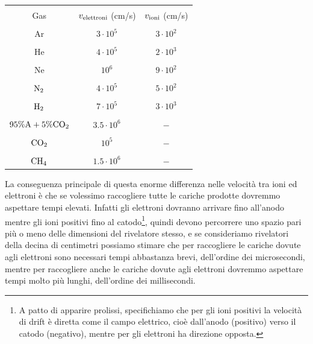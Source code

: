 \begin{center}
   \begin{tabular}{|c|c|c|}
     \hline
     &&\\[-0.4cm]
     Gas & $v_{\rm elettroni}$ (cm/s) & $v_{\rm ioni}$ (cm/s)\\
     \hline
     &&\\[-0.35cm]
     Ar & $3 \cdot 10^5$ & $3 \cdot 10^2$\\
     \hline
     &&\\[-0.35cm]
     He & $4 \cdot 10^5$ & $2 \cdot 10^3$\\
     \hline
     &&\\[-0.35cm]
     Ne & $10^6$ & $9 \cdot 10^2$\\
     \hline
     &&\\[-0.35cm]
     $\rm N_2$ & $4 \cdot 10^5$ & $5 \cdot 10^2$\\
     \hline
     &&\\[-0.35cm]
     $\rm H_2$ & $7 \cdot 10^5$ & $3 \cdot 10^3$\\
     \hline
     &&\\[-0.35cm]
     $\rm 95\% A + 5\% CO_2$ & $3.5 \cdot 10^6$ & $-$\\
     \hline
     &&\\[-0.35cm]
     $\rm CO_2$ & $10^5$ & $-$\\
     \hline
     &&\\[-0.35cm]
     $\rm CH_4$ & $1.5 \cdot 10^6$ & $-$\\
     \hline
   \end{tabular}
\end{center}
La conseguenza principale di questa enorme differenza nelle velocità tra ioni ed elettroni è che se volessimo raccogliere tutte le cariche prodotte dovremmo aspettare tempi elevati. Infatti gli elettroni dovranno arrivare fino all'anodo mentre gli ioni positivi fino al catodo\footnote{A patto di apparire prolissi, specifichiamo che per gli ioni positivi la velocità di drift è diretta come il campo elettrico, cioè dall'anodo (positivo) verso il catodo (negativo), mentre per gli elettroni ha direzione opposta.}, quindi devono percorrere uno spazio pari più o meno delle dimensioni del rivelatore stesso, e se consideriamo rivelatori della decina di centimetri possiamo stimare che per raccogliere le cariche dovute agli elettroni sono necessari tempi abbastanza brevi, dell'ordine dei microsecondi, mentre per raccogliere anche le cariche dovute agli elettroni dovremmo aspettare tempi molto più lunghi, dell'ordine dei millisecondi.

